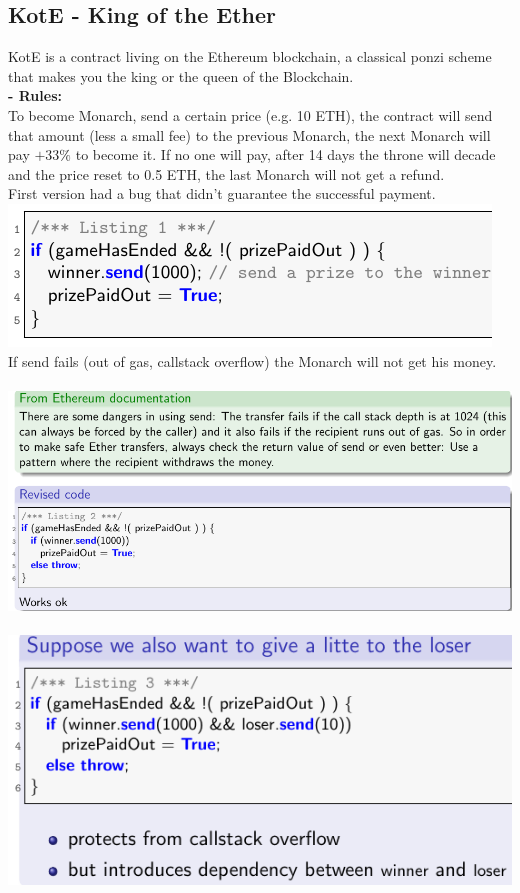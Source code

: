 \documentclass{article}
\begin{document}
\subsection{KotE - King of the Ether}
KotE is a contract living on the Ethereum blockchain, a classical ponzi scheme that makes you the king or the queen of the Blockchain. \\
\textbf{- Rules: }\\
To become Monarch, send a certain price (e.g. 10 ETH), the contract will send that amount (less a small fee) to the previous Monarch, the next Monarch will pay $+33\%$ to become it. If no one will pay, after 14 days the throne will decade and the price reset to 0.5 ETH, the last Monarch will not get a refund.\\
First version had a bug that didn't guarantee the successful payment.\\
\includegraphics[scale=0.3]{91.png}\\
If send fails (out of gas, callstack overflow) the Monarch will not get his money.\\\\
\includegraphics[scale=0.3]{92.png}\\\\
\includegraphics[scale=0.3]{93.png}
\end{document}

